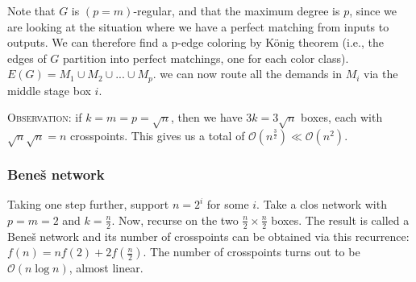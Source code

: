 \documentclass[11pt, letterpaper, oneside]{article}
\newcommand{\bigO}{\ensuremath{\mathcal{O}}}%
\begin{document}
Note that $G$ is $(p=m)$-regular, and that the maximum degree is $p$, since we are looking at the situation where we have a perfect matching from inputs to outputs. We can therefore find a p-edge coloring by K\"{o}nig theorem (i.e., the edges of $G$ partition into perfect matchings, one for each color class). $E(G) = M_1 \cup M_2 \cup ... \cup M_p$. we can now route all the demands in $M_i$ via the middle stage box $i$.

\textsc{Observation:} if $k=m=p=\sqrt{n}$, then we have $3k=3\sqrt{n}$ boxes, each with $\sqrt{n}\sqrt{n}=n$ crosspoints. This gives us a total of $\bigO(n^{\frac{3}{2}}) \ll \bigO(n^2)$.

\subsubsection{Bene\v{s} network}

Taking one step further, support $n=2^i$ for some $i$. Take a clos network with $p=m=2$ and $k=\frac{n}{2}$. Now, recurse on the two $\frac{n}{2} \times \frac{n}{2}$ boxes. The result is called a Bene\v{s} network and its number of crosspoints can be obtained via this recurrence: $ f(n) = n f(2) + 2 f\left(\frac{n}{2}\right) $. The number of crosspoints turns out to be $\bigO(n\log{n})$, almost linear.
\end{document}
